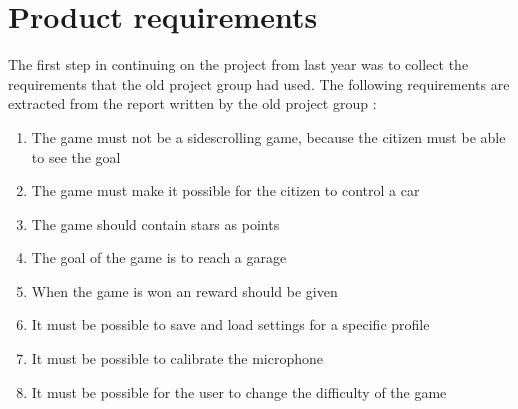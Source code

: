 \section{Product requirements}

The first step in continuing on the project from last year was to collect the requirements that the old project group had used.
The following requirements are extracted from the report written by the old project group \citet*{oldcars}:

\begin{enumerate}
\item The game must not be a sidescrolling game, because the citizen must be able to see the goal
\item The game must make it possible for the citizen to control a car
\item The game should contain stars as points
\item The goal of the game is to reach a garage
\item When the game is won an reward should be given
\item It must be possible to save and load settings for a specific profile
\item It must be possible to calibrate the microphone 
\item It must be possible for the user to change the difficulty of the game
\end{enumerate}